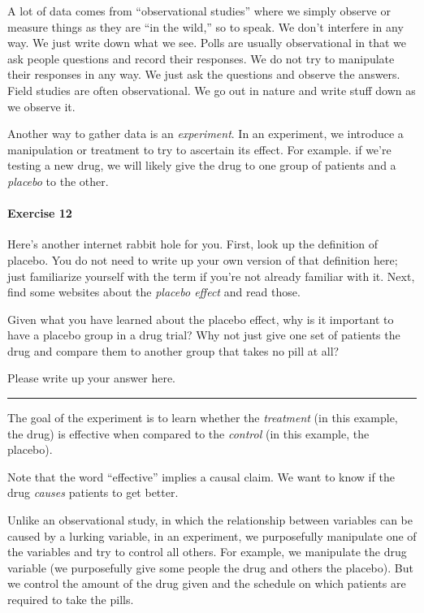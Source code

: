 \documentclass[
]{book}
\begin{document}
A lot of data comes from ``observational studies'' where we simply observe or measure things as they are ``in the wild,'' so to speak. We don't interfere in any way. We just write down what we see. Polls are usually observational in that we ask people questions and record their responses. We do not try to manipulate their responses in any way. We just ask the questions and observe the answers. Field studies are often observational. We go out in nature and write stuff down as we observe it.

Another way to gather data is an \emph{experiment}. In an experiment, we introduce a manipulation or treatment to try to ascertain its effect. For example. if we're testing a new drug, we will likely give the drug to one group of patients and a \emph{placebo} to the other.

\hypertarget{exercise-12-3}{%
\paragraph*{Exercise 12}\label{exercise-12-3}}

Here's another internet rabbit hole for you. First, look up the definition of placebo. You do not need to write up your own version of that definition here; just familiarize yourself with the term if you're not already familiar with it. Next, find some websites about the \emph{placebo effect} and read those.

Given what you have learned about the placebo effect, why is it important to have a placebo group in a drug trial? Why not just give one set of patients the drug and compare them to another group that takes no pill at all?

Please write up your answer here.

\begin{center}\rule{0.5\linewidth}{0.5pt}\end{center}

The goal of the experiment is to learn whether the \emph{treatment} (in this example, the drug) is effective when compared to the \emph{control} (in this example, the placebo).

Note that the word ``effective'' implies a causal claim. We want to know if the drug \emph{causes} patients to get better.

Unlike an observational study, in which the relationship between variables can be caused by a lurking variable, in an experiment, we purposefully manipulate one of the variables and try to control all others. For example, we manipulate the drug variable (we purposefully give some people the drug and others the placebo). But we control the amount of the drug given and the schedule on which patients are required to take the pills.
\end{document}
